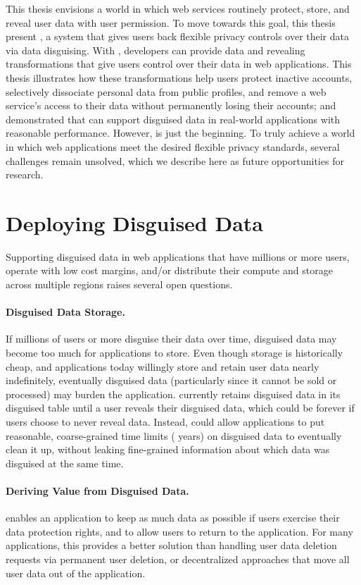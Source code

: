 This thesis envisions a world in which web services routinely
protect, store, and reveal \xxed user data with user permission.
%
To move towards this goal, this thesis present \sys, a system that gives users back
flexible privacy controls over their data via data disguising.
%
With \sys, developers can provide data \xxing and revealing transformations that
give users control over their data in web applications.
%
This thesis illustrates how these transformations help users protect
inactive accounts, selectively dissociate personal data from public profiles,
and remove a web service's access to their data without permanently losing their
accounts;
%
and demonstrated that \sys can support disguised data in real-world applications with
reasonable performance.
%
However, \sys is just the beginning. To truly achieve a world in which web
applications meet the desired flexible privacy standards, several
challenges remain unsolved, which we describe here as future
opportunities for research.
%

\section{Deploying Disguised Data}

Supporting disguised data in web applications that have millions or more users,
operate with low cost margins, and/or distribute their compute and storage
across multiple regions raises several open questions.

%
\paragraph{Disguised Data Storage.} If millions of users or more disguise their
data over time, disguised data may become too much for applications to store.
%
Even though storage is historically cheap, and applications today willingly
store and retain user data nearly indefinitely, eventually disguised data
(particularly since it cannot be sold or processed) may burden the application.
%
\sys currently retains disguised data in its disguised table until a user
reveals their disguised data, which could be forever if users choose to never
reveal data.
%
Instead, \sys could allow applications to put reasonable, coarse-grained time
limits ( years) on disguised data to eventually clean it up, without
leaking fine-grained information about which data was disguised at the same
time.
%

%
\paragraph{Deriving Value from Disguised Data.} 
\sys enables an application to keep as much data as possible if users exercise
their data protection rights, and to allow users to return to the application.
For many applications, this provides a better solution than handling user data
deletion requests via permanent user deletion, or decentralized approaches that
move all user data out of the application.

